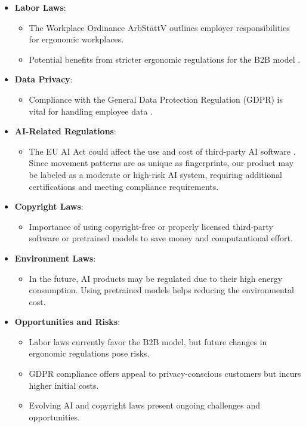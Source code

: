 \begin{itemize}
  \item \textbf{Labor Laws}:
  \begin{itemize}
    \item The Workplace Ordinance ArbStättV outlines employer responsibilities for ergonomic workplaces.
    \item Potential benefits from stricter ergonomic regulations for the B2B model \autocite{ArbStattV}.
  \end{itemize}

  \item \textbf{Data Privacy}:
  \begin{itemize}
    \item Compliance with the General Data Protection Regulation (GDPR) is vital for handling employee data \autocite{GDPR}.
  \end{itemize}

  \item \textbf{AI-Related Regulations}:
  \begin{itemize}
    \item The EU AI Act could affect the use and cost of third-party AI software \autocite{EUAIACT}. 
    Since movement patterns are as unique as fingerprints, our product may be labeled as a moderate or high-risk AI system, requiring additional certifications and meeting compliance requirements.
  \end{itemize}

  \item \textbf{Copyright Laws}:
  \begin{itemize}
    \item Importance of using copyright-free or properly licensed third-party software or pretrained models \autocite{CopyrightLaws} to save money and computantional effort. 
  \end{itemize}

  \item \textbf{Environment Laws}:
  \begin{itemize}
    \item In the future, AI products may be regulated due to their high energy consumption. Using pretrained models \autocite{CopyrightLaws} helps reducing the environmental cost.
  \end{itemize}

  \item \textbf{Opportunities and Risks}:
  \begin{itemize}
    \item Labor laws currently favor the B2B model, but future changes in ergonomic regulations pose risks.
    \item GDPR compliance offers appeal to privacy-conscious customers but incurs higher initial costs.
    \item Evolving AI and copyright laws present ongoing challenges and opportunities.
  \end{itemize}
\end{itemize}


